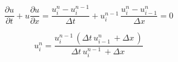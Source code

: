 	\begin{equation}
	\frac {\partial u}{\partial t}+u{\frac {\partial u}{\partial x}} = \frac{u_{i}^{n}-u_{i}^{n-1}}{\Delta t}+ u_{i}^{n-1}\, \frac{u_{i}^{n}-u_{i-1}^{n}}{\Delta x}=0
	\end{equation}
	
	\begin{equation}
	 u_{i}^{n} = \frac{u^{n-1}_{i}\, \left(\Delta{t}\, u^{n}_{i-1}\, + \Delta{x}\,\right)}{\Delta{t}\, u^{n-1}_{i}\, + \Delta{x}\,}
	\end{equation}